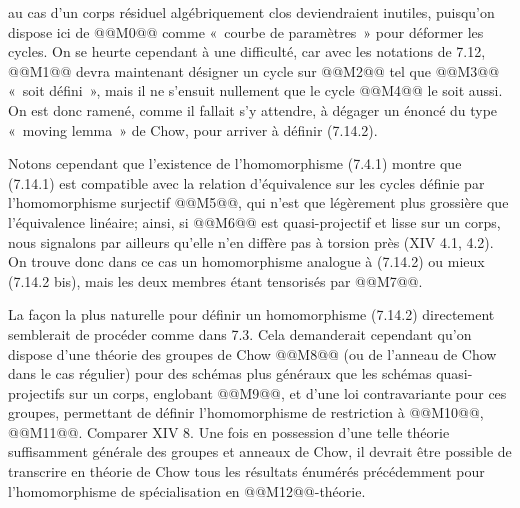 
au cas d'un corps résiduel algébriquement clos deviendraient inutiles, puisqu'on dispose ici de @@M0@@ comme «~courbe de paramètres~» pour déformer les cycles. On se heurte cependant à une difficulté, car avec les notations de 7.12, @@M1@@ devra maintenant désigner un cycle sur @@M2@@ tel que @@M3@@ «~soit défini~», mais il ne s'ensuit nullement que le cycle @@M4@@ le soit aussi. On est donc ramené, comme il fallait s'y attendre, à dégager un énoncé du type «~moving lemma~» de Chow, pour arriver à définir (7.14.2).

Notons cependant que l'existence de l'homomorphisme (7.4.1) montre que (7.14.1) est compatible avec la relation d'équivalence sur les cycles définie par l'homomorphisme surjectif @@M5@@, qui n'est que légèrement plus grossière que l'équivalence linéaire; ainsi, si @@M6@@ est quasi-projectif et lisse sur un corps, nous signalons par ailleurs qu'elle n'en diffère pas à torsion près (XIV 4.1, 4.2). On trouve donc dans ce cas un homomorphisme analogue à (7.14.2) ou mieux (7.14.2 bis), mais les deux membres étant tensorisés par @@M7@@.

La façon la plus naturelle pour définir un homomorphisme (7.14.2) directement semblerait de procéder comme dans 7.3. Cela demanderait cependant qu'on dispose d'une théorie des groupes de Chow @@M8@@ (ou de l'anneau de Chow dans le cas régulier) pour des schémas plus généraux que les schémas quasi-projectifs sur un corps, englobant @@M9@@, et d'une loi contravariante pour ces groupes, permettant de définir l'homomorphisme de restriction à @@M10@@, @@M11@@. Comparer XIV 8. Une fois en possession d'une telle théorie suffisamment générale des groupes et anneaux de Chow, il devrait être possible de transcrire en théorie de Chow tous les résultats énumérés précédemment pour l'homomorphisme de spécialisation en @@M12@@-théorie.

